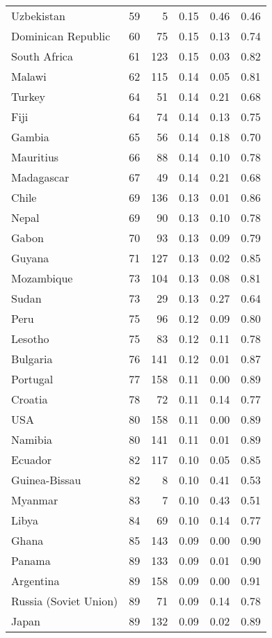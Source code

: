 \begin{longtable}[t]{lrrrrr}
Uzbekistan & 59 & 5 & 0.15 & 0.46 & 0.46\\
Dominican Republic & 60 & 75 & 0.15 & 0.13 & 0.74\\
\addlinespace
South Africa & 61 & 123 & 0.15 & 0.03 & 0.82\\
Malawi & 62 & 115 & 0.14 & 0.05 & 0.81\\
Turkey & 64 & 51 & 0.14 & 0.21 & 0.68\\
Fiji & 64 & 74 & 0.14 & 0.13 & 0.75\\
Gambia & 65 & 56 & 0.14 & 0.18 & 0.70\\
\addlinespace
Mauritius & 66 & 88 & 0.14 & 0.10 & 0.78\\
Madagascar & 67 & 49 & 0.14 & 0.21 & 0.68\\
Chile & 69 & 136 & 0.13 & 0.01 & 0.86\\
Nepal & 69 & 90 & 0.13 & 0.10 & 0.78\\
Gabon & 70 & 93 & 0.13 & 0.09 & 0.79\\
\addlinespace
Guyana & 71 & 127 & 0.13 & 0.02 & 0.85\\
Mozambique & 73 & 104 & 0.13 & 0.08 & 0.81\\
Sudan & 73 & 29 & 0.13 & 0.27 & 0.64\\
Peru & 75 & 96 & 0.12 & 0.09 & 0.80\\
Lesotho & 75 & 83 & 0.12 & 0.11 & 0.78\\
\addlinespace
Bulgaria & 76 & 141 & 0.12 & 0.01 & 0.87\\
Portugal & 77 & 158 & 0.11 & 0.00 & 0.89\\
Croatia & 78 & 72 & 0.11 & 0.14 & 0.77\\
USA & 80 & 158 & 0.11 & 0.00 & 0.89\\
Namibia & 80 & 141 & 0.11 & 0.01 & 0.89\\
\addlinespace
Ecuador & 82 & 117 & 0.10 & 0.05 & 0.85\\
Guinea-Bissau & 82 & 8 & 0.10 & 0.41 & 0.53\\
Myanmar & 83 & 7 & 0.10 & 0.43 & 0.51\\
Libya & 84 & 69 & 0.10 & 0.14 & 0.77\\
Ghana & 85 & 143 & 0.09 & 0.00 & 0.90\\
\addlinespace
Panama & 89 & 133 & 0.09 & 0.01 & 0.90\\
Argentina & 89 & 158 & 0.09 & 0.00 & 0.91\\
Russia (Soviet Union) & 89 & 71 & 0.09 & 0.14 & 0.78\\
Japan & 89 & 132 & 0.09 & 0.02 & 0.89\\

\end{longtable}
